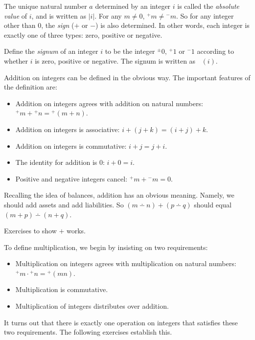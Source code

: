 \documentclass[10pt,oneside,tightlist]{memoir}
\DeclareMathOperator{\sgn}{mathsf{sgn}}
\begin{document}
The unique natural number $a$ determined by an integer $i$ is 
called the \emph{absolute value} of $i$, and is written as $|i|$.  For
any $m\neq 0$, ${}^+m \neq {}^-m$. So for any integer other than $0$,
the \emph{sign} ($+$ or $-$) is also determined. In other words, each
integer is exactly one of three types: zero, positive or negative.

Define the \emph{signum} of an integer $i$ to be the integer
${}^\pm0$, ${}^+1$ or ${}^-1$ according to whether $i$ is zero,
positive or negative. The signum is written as $\sgn(i)$.

Addition on integers can be defined in the obvious way. The important
features of the definition are:
\begin{itemize}
\item Addition on integers agrees with addition on natural numbers: ${}^+
  m + {}^+n = {}^+(m+n)$.
\item Addition on integers is associative: $i+(j+k) = (i+j)+k$.
\item Addition on integers is commutative: $i+j = j+i$.
\item The identity for addition is $0$: $i+0 = i$.
\item Positive and negative integers cancel: ${}^+m + {}^-m = 0$.
\end{itemize}

Recalling the idea of balances, addition has an obvious meaning.
Namely, we should add assets and add liabilities. So $(m\dotminus n) + (p\dotminus q)$
should equal $(m+p)\dotminus(n+q)$.

Exercises to show $+$ works.

To define multiplication, we begin by insisting on two requirements:
\begin{itemize}
\item Multiplication on integers agrees with multiplication on natural numbers: ${}^+m\cdot {}^+n = {}^+(mn)$.
\item Multiplication is commutative. 
\item Multiplication of integers distributes over addition.
\end{itemize}

It turns out that there is exactly one operation on integers that satisfies these two requirements.
The following exercises establish this. 
\end{document}
